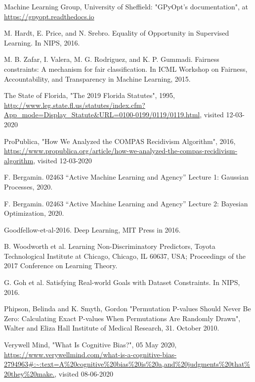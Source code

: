 \documentclass[11pt, fleqn, titlepage]{article}
\begin{document}
	\begin{thebibliography}{9} \label{bibliography}
		
		 Machine Learning Group, University of Sheffield: "GPyOpt’s documentation", at \url{https://gpyopt.readthedocs.io}
		
		 M. Hardt, E. Price, and N. Srebro. Equality of Opportunity in Supervised Learning. In NIPS, 2016.
		
		 M. B. Zafar, I. Valera, M. G. Rodriguez, and K. P. Gummadi. Fairness constraints: A mechanism for fair classification.
		In ICML Workshop on Fairness, Accountability, and Transparency in Machine Learning, 2015.
		
		 The State of Florida, "The 2019 Florida Statutes", 1995,  \url{http://www.leg.state.fl.us/statutes/index.cfm?App_mode=Display_Statute&URL=0100-0199/0119/0119.html}, visited 12-03-2020
		
		 ProPublica, "How We Analyzed the COMPAS Recidivism Algorithm", 2016, \url{https://www.propublica.org/article/how-we-analyzed-the-compas-recidivism-algorithm}, visited 12-03-2020
		
		 F. Bergamin. 02463 “Active Machine Learning and Agency” Lecture 1: Gaussian Processes, 2020.
		
		 F. Bergamin. 02463 “Active Machine Learning and Agency” Lecture 2: Bayesian Optimization, 2020.
		
		 Goodfellow-et-al-2016. Deep Learning, MIT Press in 2016. 
		
		 B. Woodworth et al. Learning Non-Discriminatory Predictors, Toyota Technological Institute at Chicago, Chicago, IL 60637, USA; Proceedings of the 2017 Conference on Learning Theory.
		
		 G. Goh et al. Satisfying Real-world Goals with Dataset Constraints. In NIPS, 2016.
		
		 Phipson, Belinda and K. Smyth, Gordon "Permutation P-values Should Never Be Zero: Calculating Exact P-values When Permutations Are Randomly Drawn", Walter and Eliza Hall Institute of Medical Research, 31. October 2010.
		
		 Verywell Mind, "What Is Cognitive Bias?", 05 May 2020,
		\url{https://www.verywellmind.com/what-is-a-cognitive-bias-2794963#:~:text=A%20cognitive%20bias%20is%20a,and%20judgments%20that%20they%20make.}, visited 08-06-2020
		

\end{thebibliography}
\end{document}
